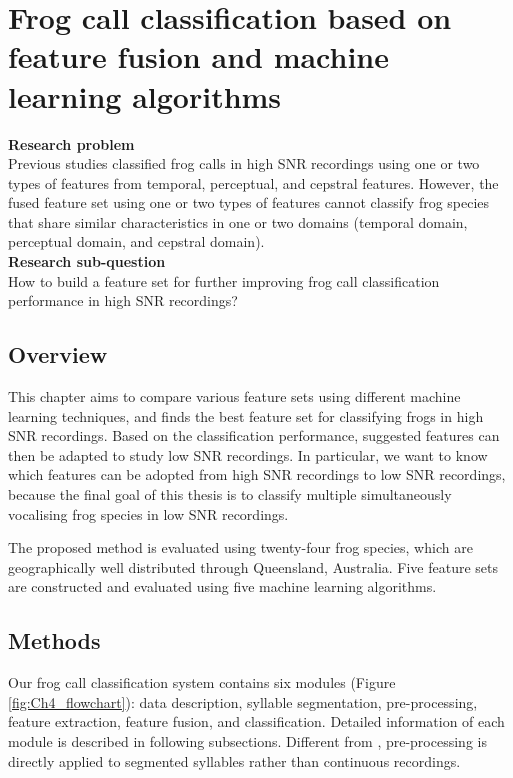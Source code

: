 
\chapter[Frog call classification based on enhanced features]{Frog call classification based on feature fusion and machine learning algorithms}
\label{cha:cha4EnhancedFeature}


\textbf{Research problem}
\\
Previous studies classified frog calls in high SNR recordings using one or two types of features from temporal, perceptual, and cepstral features. However, the fused feature set using one or two types of features cannot classify frog species that share similar characteristics in one or two domains (temporal domain, perceptual domain, and cepstral domain).
\\
\textbf{Research sub-question}
\\
How to build a feature set for further improving frog call classification performance in high SNR recordings?



\section{Overview}
\label{S:1}



This chapter aims to compare various feature sets using different machine learning techniques, and finds the best feature set for classifying frogs in high SNR recordings. 
Based on the classification performance, suggested features can then be adapted to study low SNR recordings. In particular, we want to know which features can be adopted from high SNR recordings to low SNR recordings, because the final goal of this thesis is to classify  multiple simultaneously vocalising frog species in low SNR recordings.

The proposed method is evaluated using twenty-four frog species, which are geographically well distributed through Queensland, Australia. Five feature sets are constructed and evaluated using five machine learning algorithms. 



\section{Methods}

Our frog call classification system contains six modules (Figure~ \ref{fig:Ch4_flowchart}): data description, syllable segmentation, pre-processing,  feature extraction, feature fusion, and classification. Detailed information of each module is described in following subsections. Different from \citep{huang2009frog}, pre-processing is directly applied to segmented syllables rather than continuous recordings.

